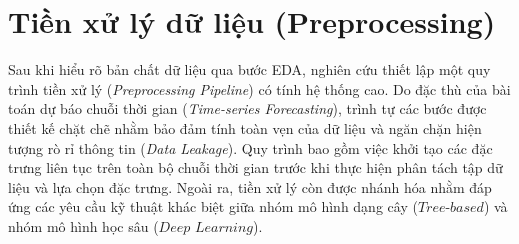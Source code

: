 \section{Tiền xử lý dữ liệu (Preprocessing)}
Sau khi hiểu rõ bản chất dữ liệu qua bước EDA, nghiên cứu thiết lập một quy trình tiền xử lý (\textit{Preprocessing Pipeline}) có tính hệ thống cao. Do đặc thù của bài toán dự báo chuỗi thời gian (\textit{Time-series Forecasting}), trình tự các bước được thiết kế chặt chẽ nhằm bảo đảm tính toàn vẹn của dữ liệu và ngăn chặn hiện tượng rò rỉ thông tin (\textit{Data Leakage}). Quy trình bao gồm việc khởi tạo các đặc trưng liên tục trên toàn bộ chuỗi thời gian trước khi thực hiện phân tách tập dữ liệu và lựa chọn đặc trưng. Ngoài ra, tiền xử lý còn được nhánh hóa nhằm đáp ứng các yêu cầu kỹ thuật khác biệt giữa nhóm mô hình dạng cây ($\textit{Tree-based}$) và nhóm mô hình học sâu ($\textit{Deep Learning}$).
